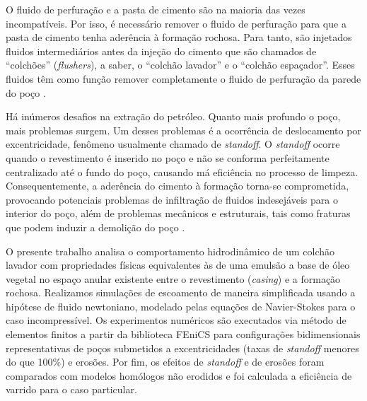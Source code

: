 O fluido de perfuração e a pasta de cimento são na maioria das vezes incompatíveis. Por isso, é necessário remover o fluido de perfuração para que a pasta de cimento tenha aderência à formação rochosa. Para tanto, são injetados fluidos intermediários antes da injeção do cimento que são chamados de ``colchões'' (\textit{flushers}), a saber, o ``colchão lavador'' e o ``colchão espaçador''. Esses fluidos têm como função remover completamente o fluido de perfuração da parede do poço \cite{ARANHA}.

Há inúmeros desafios na extração do petróleo. Quanto mais profundo o poço, mais problemas surgem. Um desses problemas é a ocorrência de deslocamento por excentricidade, fenômeno usualmente chamado de \textit{standoff}. O \textit{standoff} ocorre quando o revestimento é inserido no poço e não se conforma perfeitamente centralizado até o fundo do poço, causando má eficiência no processo de limpeza. Consequentemente, a aderência do cimento à formação torna-se comprometida, provocando potenciais problemas de infiltração de fluidos indesejáveis para o interior do poço, além de problemas mecânicos e estruturais, tais como fraturas que podem induzir a demolição do poço \cite{Erik}. 

O presente trabalho analisa o comportamento hidrodinâmico de um colchão lavador com propriedades físicas equivalentes às de uma emulsão a base de óleo vegetal no espaço anular existente entre o revestimento (\textit{casing}) e a formação rochosa. Realizamos simulações de escoamento de maneira simplificada usando a hipótese de fluido newtoniano, modelado pelas equações de Navier-Stokes para o caso incompressível. Os experimentos numéricos são executados via método de elementos finitos a partir da biblioteca FEniCS para configurações bidimensionais representativas de poços submetidos a excentricidades (taxas de \textit{standoff} menores do que 100\%) e erosões. Por fim, os efeitos de \textit{standoff} e de erosões foram comparados com modelos homólogos não erodidos e foi calculada a eficiência de varrido para o caso particular.

